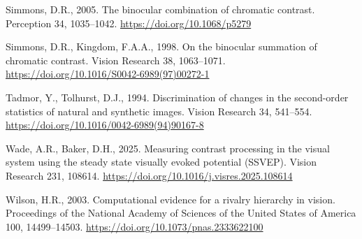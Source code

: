 \documentclass[
  12pt,
]{article}
\newlength{\cslhangindent}
\newenvironment{CSLReferences}[2] %
 {\begin{list}{}{%
  \setlength{\itemindent}{0pt}
  \setlength{\leftmargin}{0pt}
  \setlength{\parsep}{0pt}
  \ifodd #1
   \setlength{\leftmargin}{\cslhangindent}
   \setlength{\itemindent}{-1\cslhangindent}
  \fi
  \setlength{\itemsep}{#2\baselineskip}}}
 {\end{list}}
\begin{document}
\begin{CSLReferences}{1}{0}
Simmons, D.R., 2005. The binocular combination of chromatic contrast.
Perception 34, 1035--1042. \url{https://doi.org/10.1068/p5279}

Simmons, D.R., Kingdom, F.A.A., 1998. On the binocular summation of
chromatic contrast. Vision Research 38, 1063--1071.
\url{https://doi.org/10.1016/S0042-6989(97)00272-1}

Tadmor, Y., Tolhurst, D.J., 1994. Discrimination of changes in the
second-order statistics of natural and synthetic images. Vision Research
34, 541--554. \url{https://doi.org/10.1016/0042-6989(94)90167-8}

Wade, A.R., Baker, D.H., 2025. Measuring contrast processing in the
visual system using the steady state visually evoked potential (SSVEP).
Vision Research 231, 108614.
\url{https://doi.org/10.1016/j.visres.2025.108614}

Wilson, H.R., 2003. Computational evidence for a rivalry hierarchy in
vision. Proceedings of the National Academy of Sciences of the United
States of America 100, 14499--14503.
\url{https://doi.org/10.1073/pnas.2333622100}

\end{CSLReferences}
\end{document}
